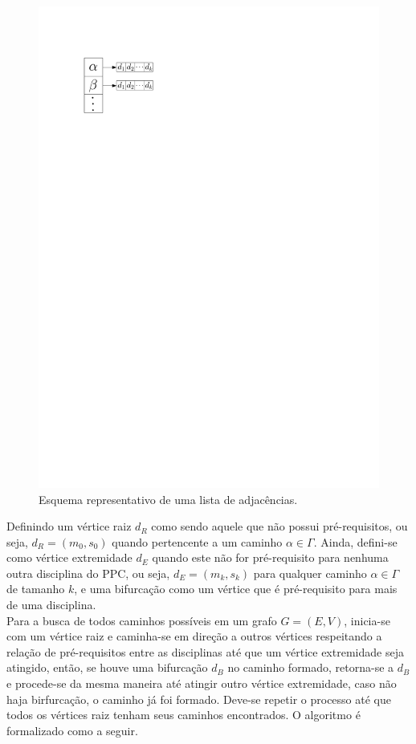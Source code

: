 \documentclass[a4paper, 12pt]{article}
\begin{document}
\begin{figure}[h]
\centering
\includegraphics[scale=0.8]{adjcencies_list.pdf}
\caption{Esquema representativo de uma lista de adjacências.}
\label{img:adjacencies_list}
\end{figure}

Definindo um vértice raiz $d_R$ como sendo aquele que não possui pré-requisitos, ou seja, $d_R = (m_0, s_0)$ quando pertencente a um caminho $\alpha \in \Gamma$. Ainda, 
defini-se como vértice extremidade $d_E$ quando este não for pré-requisito para nenhuma outra disciplina do PPC, ou seja, $d_E = (m_k, s_k)$ para qualquer caminho 
$\alpha \in \Gamma$ de tamanho $k$, e uma bifurcação como um vértice que é pré-requisito para mais de uma disciplina. \\

Para a busca de todos caminhos possíveis em um grafo $G = (E, V)$, inicia-se com um vértice raiz e caminha-se em direção a outros vértices respeitando a relação de 
pré-requisitos entre as disciplinas até que um vértice extremidade seja atingido, então, se houve uma bifurcação $d_B$ no caminho formado, retorna-se a $d_B$ e 
procede-se da mesma maneira até atingir outro vértice extremidade, caso não haja 
birfurcação, o caminho já foi formado. Deve-se repetir o processo até que todos 
os vértices raiz tenham seus caminhos encontrados. O algoritmo é formalizado como a seguir. \\
\end{document}
